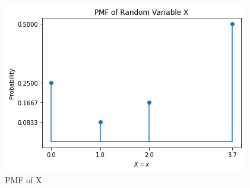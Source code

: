 \documentclass[journal,12pt,twocolumn]{IEEEtran}
\begin{document}
\vfill\eject
\begin{figure}[ht]
    \centering
    \includegraphics[width=\columnwidth]{PMF.png}
    \caption{PMF of X}
    \label{fig:2}
\end{figure}
\end{document}
